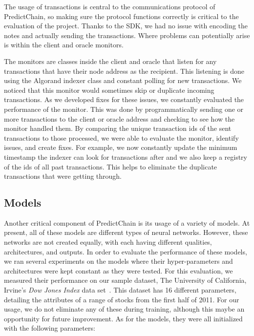 \documentclass{ledger}
\begin{document}
The usage of transactions is central to the communications protocol of PredictChain, so making sure the protocol
functions correctly is critical to the evaluation of the project.  Thanks to the SDK, we had no issue with encoding the
notes and actually sending the transactions.  Where problems can potentially arise is within the
client and oracle monitors.

The monitors are classes inside the client and oracle that listen for any transactions that have their node address
as the recipient.  This listening is done using the Algorand indexer class and constant polling for new transactions.
We noticed that this monitor would sometimes skip or duplicate incoming transactions.  As we developed fixes for
these issues, we constantly evaluated the performance of the monitor.  This was done by programmatically sending
one or more transactions to the client or oracle address and checking to see how the monitor handled them.  By comparing
the unique transaction ids of the sent transactions to those processed, we were able to evaluate the monitor,
identify issues, and create fixes. For example, we now constantly update the minimum timestamp the indexer can look
for transactions after and we also keep a registry of the ids of all past transactions.  This helps to eliminate
the duplicate transactions that were getting through.

\subsection{Models}

Another critical component of PredictChain is its usage of a variety of models.  At present, all of these models
are different types of neural networks.  However, these networks are not created equally, with each having different
qualities, architectures, and outputs.  In order to evaluate the performance of these models, we ran several experiments
on the models where their hyper-parameters and architectures were kept constant as they were tested.  For this
evaluation, we measured their performance on our sample dataset, The University of California, Irvine's \textit{Dow Jones
Index} data set~\cite{dowJones}.  This dataset has 16 different parameters, detailing the attributes of a range of
stocks from the first half of 2011.  For our usage, we do not eliminate any of these during training, although this
maybe an opportunity for future improvement.  As for the models, they were all initialized with the following parameters:
\end{document}

